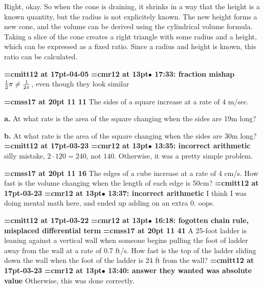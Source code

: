 Right, okay. So when the cone is draining, it shrinks in a way that the height is a known quantity, but the radius is not explicitely known. The new height forms a new cone, and the volume can be derived using the cylindrical volume formula. Taking a slice of the cone creates a right triangle with some radius and a height, which can be expressed as a fixed ratio. Since a radius and height is known, this ratio can be calculated.
\par

{\medskip\noindent\bf\font\titlefont=cmitt12 at 17pt-04-05}\medskip
{\smallskip\noindent\bf\font\titlefont=cmr12 at 13pt\titlefont $\bullet$ 17:33: fraction mishap}\smallskip
${1 \over 2} \pi \ne {1 \over 2\pi}$, even though they look similar
\par

{\medskip\noindent\bf\font\titlefont=cmss17 at 20pt 11 11}\medskip
The sides of a square increase at a rate of 4 m/sec.
\par {\bf a.}
At what rate is the area of the square changing
when the sides are 19m long?
\par {\bf b.}
At what rate is the area of the square changing
when the sides are 30m long?
{\medskip\noindent\bf\font\titlefont=cmitt12 at 17pt-03-23}\medskip
{\smallskip\noindent\bf\font\titlefont=cmr12 at 13pt\titlefont $\bullet$ 13:35: incorrect arithmetic}\smallskip
silly mistake, $2\cdot 120=240$, not $140$. Otherwise, it was a pretty simple problem.
\par

{\medskip\noindent\bf\font\titlefont=cmss17 at 20pt 11 16}\medskip
The edges of a cube increase at a rate of 4 cm/s. How
fast is the volume changing when the length of each edge
is 50cm?
{\medskip\noindent\bf\font\titlefont=cmitt12 at 17pt-03-23}\medskip
{\smallskip\noindent\bf\font\titlefont=cmr12 at 13pt\titlefont $\bullet$ 13:37: incorrect arithmetic}\smallskip
I think I was doing mental math here, and ended up adding on an extra 0. oops.
\par

{\medskip\noindent\bf\font\titlefont=cmitt12 at 17pt-03-22}\medskip
{\smallskip\noindent\bf\font\titlefont=cmr12 at 13pt\titlefont $\bullet$ 16:18: fogotten chain rule, misplaced differential term}\smallskip
{}
{\medskip\noindent\bf\font\titlefont=cmss17 at 20pt 11 41}\medskip
A 25-foot ladder is leaning against a vertical wall when someone
begins pulling the foot of ladder away from the wall at a rate
of 0.7 ft/s. How fast is the top of the ladder sliding down the wall
when the foot of the ladder is 24 ft from the wall?
{\medskip\noindent\bf\font\titlefont=cmitt12 at 17pt-03-23}\medskip
{\smallskip\noindent\bf\font\titlefont=cmr12 at 13pt\titlefont $\bullet$ 13:40: answer they wanted was absolute value}\smallskip
Otherwise, this was done correctly.
\par

